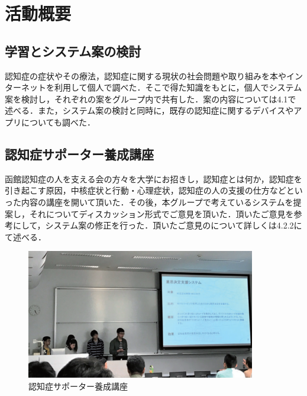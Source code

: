\documentclass[../report]{subfiles}
\begin{document}
\section{活動概要}
\subsection{学習とシステム案の検討}\label{sec:kentou}
認知症の症状やその療法，認知症に関する現状の社会問題や取り組みを本やインターネットを利用して個人で調べた．そこで得た知識をもとに，個人でシステム案を検討し，それぞれの案をグループ内で共有した．案の内容については4.1で述べる．また，システム案の検討と同時に，既存の認知症に関するデバイスやアプリについても調べた．

\subsection{認知症サポーター養成講座}
函館認知症の人を支える会の方々を大学にお招きし，認知症とは何か，認知症を引き起こす原因，中核症状と行動・心理症状，認知症の人の支援の仕方などといった内容の講座を開いて頂いた．その後，本グループで考えているシステムを提案し，それについてディスカッション形式でご意見を頂いた．頂いたご意見を参考にして，システム案の修正を行った．頂いたご意見のについて詳しくは4.2.2にて述べる．
\begin{figure}[htbp]
    \begin{center}
        \includegraphics[width=10cm]{imgs/ninchisyo-kouza.png}
        \caption{認知症サポーター養成講座}
        \label{fig:ninchisyo-kouza}
    \end{center}
\end{figure}
\end{document}
